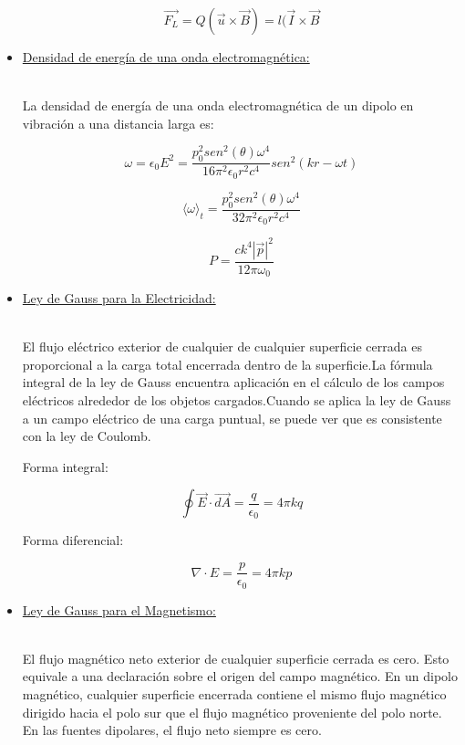 \documentclass[letterpaper,12pt]{article}
\begin{document}
\begin{itemize}
{    $$\vec{F_L}=Q(\vec{u}\times\vec{B})=l(\vec{I}\times\vec{B}$$

    }

    \item[\HandRight]\large{\underline{Densidad de energía de una onda electromagnética:}}\\\\
    \small{La densidad de energía de una onda electromagnética de un dipolo en vibración a una distancia larga es:

    $$\omega=\epsilon_0 E^2=\frac{p_0^2sen^2(\theta)\omega^4}{16\pi^2\epsilon_0r^2c^4}sen^2(kr-\omega t)$$

    $$\langle\omega\rangle_t=\frac{p_0^2sen^2(\theta)\omega^4}{32\pi^2\epsilon_0r^2c^4}$$

    $$P=\frac{ck^4|\vec{p} |^2}{12\pi\omega_0}$$

    }

    \item[\HandRight]\large{\underline{Ley de Gauss para la Electricidad:}}\\\\
    \small{El flujo eléctrico exterior de cualquier de cualquier superficie cerrada es proporcional a la carga total encerrada dentro de la superficie.La fórmula integral de la ley de Gauss encuentra aplicación en el cálculo de los campos eléctricos alrededor de los objetos cargados.Cuando se aplica la ley de Gauss a un campo eléctrico de una carga puntual, se puede ver que es consistente con la ley de Coulomb.

    Forma integral:
    
    $$\oint\vec{E}\cdot\vec{dA}=\frac{q}{\epsilon_0}=4\pi kq$$
    
    Forma diferencial:
    
    $$\nabla\cdot E=\frac{p}{\epsilon_0}=4\pi kp$$
    
    }

    
    \item[\HandRight]\large{\underline{Ley de Gauss para el Magnetismo:}}\\\\
    \small{El flujo magnético neto exterior de cualquier superficie cerrada es cero. Esto equivale a una declaración sobre el origen del campo magnético. En un dipolo magnético, cualquier superficie encerrada contiene el mismo flujo magnético dirigido hacia el polo sur que el flujo magnético proveniente del polo norte. En las fuentes dipolares, el flujo neto siempre es cero. 
    
}
\end{itemize}
\end{document}
